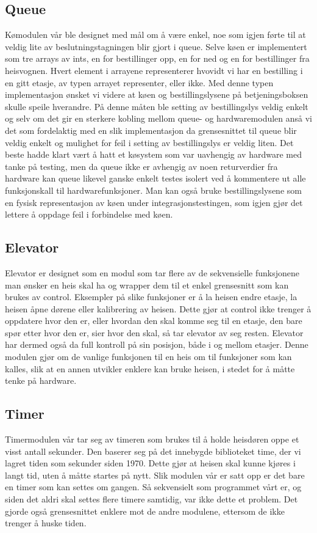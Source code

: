 \documentclass{article}
\begin{document}
\subsection{Queue}  
Kømodulen vår ble designet med mål om å være enkel, noe som igjen førte til at veldig lite av beslutningstagningen blir gjort i queue. Selve køen er implementert som tre arrays av ints, en for bestillinger opp, en for ned og en for bestillinger fra heisvognen. Hvert element i arrayene representerer hvovidt vi har en bestilling i en gitt etasje, av typen arrayet representer, eller ikke. Med denne typen implementasjon ønsket vi videre at køen og bestillingslysene på betjeningsboksen skulle speile hverandre. På denne måten ble setting av bestillingslys veldig enkelt og selv om det gir en sterkere kobling mellom queue- og hardwaremodulen anså vi det som fordelaktig med en slik implementasjon da grensesnittet til queue blir veldig enkelt og mulighet for feil i setting av bestillingslys er veldig liten. Det beste hadde klart vært å hatt et køsystem som var uavhengig av hardware med tanke på testing, men da queue ikke er avhengig av noen returverdier fra hardware kan queue likevel ganske enkelt testes isolert ved å kommentere ut alle funksjonskall til hardwarefunksjoner. Man kan også bruke bestillingslysene som en fysisk representasjon av køen under integrasjonstestingen, som igjen gjør det lettere å oppdage feil i forbindelse med køen.
\subsection{Elevator}
Elevator er designet som en modul som tar flere av de sekvensielle funksjonene man ønsker en heis skal ha og wrapper dem til et enkel grensesnitt som kan brukes av control. Eksempler på slike funksjoner er å la heisen endre etasje, la heisen åpne dørene eller kalibrering av heisen. Dette gjør at control ikke trenger å oppdatere hvor den er, eller hvordan den skal komme seg til en etasje, den bare spør etter hvor den er, sier hvor den skal, så tar elevator av seg resten. Elevator har dermed også da full kontroll på sin posisjon, både i og mellom etasjer. Denne modulen gjør om de vanlige funksjonen til en heis om til funksjoner som kan kalles, slik at en annen utvikler enklere kan bruke heisen, i stedet for å måtte tenke på hardware.
\subsection{Timer}
Timermodulen vår tar seg av timeren som brukes til å holde heisdøren oppe et visst antall sekunder. Den baserer seg på det innebygde biblioteket time, der vi lagret tiden som sekunder siden 1970. Dette gjør at heisen skal kunne kjøres i langt tid, uten å måtte startes på nytt. Slik modulen vår er satt opp er det bare en timer som kan settes om gangen. Så sekvensielt som programmet vårt er, og siden det aldri skal settes flere timere samtidig, var ikke dette et problem. Det gjorde også grensesnittet enklere mot de andre modulene, ettersom de ikke trenger å huske tiden. 
\end{document}
